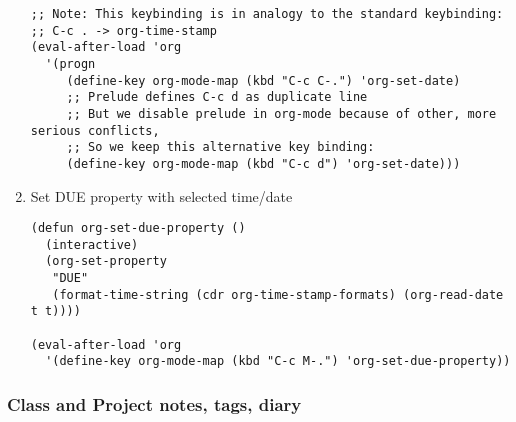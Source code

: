 \documentclass{article}
\begin{document}
\begin{enumerate}
\begin{verbatim}
;; Note: This keybinding is in analogy to the standard keybinding:
;; C-c . -> org-time-stamp
(eval-after-load 'org
  '(progn
     (define-key org-mode-map (kbd "C-c C-.") 'org-set-date)
     ;; Prelude defines C-c d as duplicate line
     ;; But we disable prelude in org-mode because of other, more serious conflicts,
     ;; So we keep this alternative key binding:
     (define-key org-mode-map (kbd "C-c d") 'org-set-date)))
\end{verbatim}

\item Set DUE property with selected time/date
\label{sec-2-5-8-6}

\begin{verbatim}
(defun org-set-due-property ()
  (interactive)
  (org-set-property
   "DUE"
   (format-time-string (cdr org-time-stamp-formats) (org-read-date t t))))

(eval-after-load 'org
  '(define-key org-mode-map (kbd "C-c M-.") 'org-set-due-property))
\end{verbatim}
\end{enumerate}

\subsubsection{Class and Project notes, tags, diary}
\label{sec-2-5-9}
\end{document}
